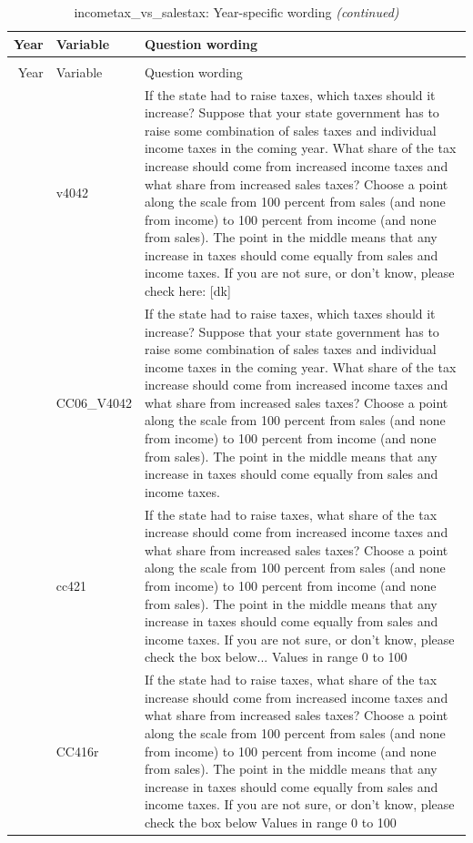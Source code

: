 \documentclass[
  12pt]{article}
\begin{document}
\begin{longtable}[t]{rl>{\raggedright\arraybackslash}p{10cm}}
\caption{\label{tab:unnamed-chunk-5}incometax\_vs\_salestax: Year-specific wording}\\
\toprule
Year & Variable & Question wording\\
\midrule
\endfirsthead
\caption[]{incometax\_vs\_salestax: Year-specific wording \textit{(continued)}}\\
\toprule
Year & Variable & Question wording\\
\midrule
\endhead

\endfoot
\bottomrule
\endlastfoot
2006 & v4042 & If the state had to raise taxes, which taxes should it increase? Suppose that your state government has to raise some combination of sales taxes and individual income taxes in the coming year. What share of the tax increase should come from increased income taxes and what share from increased sales taxes? Choose a point along the scale from 100 percent from sales (and none from income) to 100 percent from income (and none from sales). The point in the middle means that any increase in taxes should come equally from sales and income taxes.  If you are not sure, or don't know, please check here: [dk]\\
\addlinespace
2007 & CC06\_V4042 & If the state had to raise taxes, which taxes should it increase? Suppose that your state government has to raise some combination of sales taxes and individual income taxes in the coming year. What share of the tax increase should come from increased income taxes and what share from increased sales taxes? Choose a point along the scale from 100 percent from sales (and none from income) to 100 percent from income (and none from sales). The point in the middle means that any increase in taxes should come equally from sales and income taxes.\\
\addlinespace
2008 & cc421 & If the state had to raise taxes, what share of the tax increase should come from increased income taxes and what share from increased sales taxes? Choose a point along the scale from 100 percent from sales (and none from income) to 100 percent from income (and none from sales). The point in the middle means that any increase in taxes should come equally from sales and income taxes.  If you are not sure, or don't know, please check the box below... Values in range 0 to 100\\
\addlinespace
2010 & CC416r & If the state had to raise taxes, what share of the tax increase should come from increased income taxes and what share from increased sales taxes? Choose a point along the scale from 100 percent from sales (and none from income) to 100 percent from income (and none from sales). The point in the middle means that any increase in taxes should come equally from sales and income taxes. If you are not sure, or don't know, please check the box below Values in range 0 to 100\\

\end{longtable}
\end{document}
